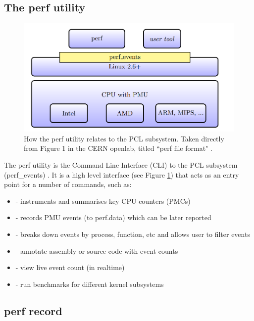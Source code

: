 \subsection{The perf utility}

\begin{figure}[h!]
\centering
    \includegraphics[width=0.8\linewidth]{report-a_perf_util_arch}
    \caption{How the perf utility relates to the PCL subsystem. Taken directly from Figure 1 in the CERN openlab, titled ``perf file format" \cite{CERN_openlab_perf_file_format}.}
    \label{fig:perf_util_arch}
\end{figure}

The perf utility is the Command Line Interface (CLI) to the PCL subsystem (perf\_events) \cite{ManPerfCLI}. It is a high level interface (see Figure \ref{fig:perf_util_arch}) that acts as an entry point for a number of commands, such as:

\ssp
\begin{itemize}
    \item {} - instruments and summarises key CPU counters (PMCs)
    \item {} - records PMU events (to perf.data) which can be later reported
    \item {} - breaks down events by process, function, etc and allows user to filter events
    \item {} - annotate assembly or source code with event counts
    \item {} - view live event count (in realtime)
    \item {} - run benchmarks for different kernel subsystems
\end{itemize}
\dsp

\subsection{perf record}

